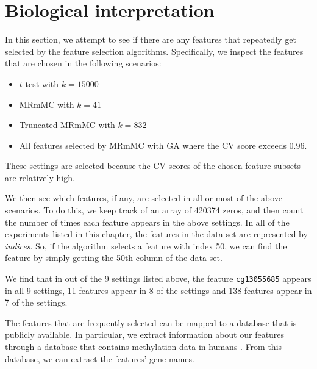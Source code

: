 \documentclass[12pt, twoside, a4paper]{report}
\begin{document}

\section{Biological interpretation} \label{bio:conclusion}

In this section, we attempt to see if there are any features that repeatedly get selected by the feature selection algorithms. Specifically, we inspect the features that are chosen in the following scenarios:
\begin{itemize}
  \item $t$-test with $k=15000$
  \item MRmMC with $k=41$
  \item Truncated MRmMC with $k=832$
  \item All features selected by MRmMC with GA where the CV score exceeds 0.96. 
\end{itemize}

These settings are selected because the CV scores of the chosen feature subsets are relatively high.

We then see which features, if any, are selected in all or most of the above scenarios. To do this, we  keep track of an array of 420374 zeros, and then count the number of times each feature appears in the above settings. In all of the experiments listed in this chapter, the features in the data set are represented by \textit{indices}. So, if the algorithm selects a feature with index 50, we can find the feature by simply getting the 50th column of the data set.

We find that in out of the 9 settings listed above, the feature \texttt{cg13055685} appears in all 9 settings, 11 features appear in 8 of the settings and 138 features appear in 7 of the settings.

The features that are frequently selected can be mapped to a database that is publicly available. In particular, we extract information about our features through a database that contains methylation data in humans \cite{bio_conclusion}. From this database, we can extract the features' gene names.
\end{document}
